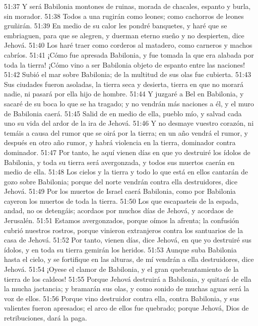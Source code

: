 51:37 Y será Babilonia montones de ruinas, morada de chacales, espanto y burla, sin morador. 
51:38 Todos a una rugirán como leones; como cachorros de leones gruñirán. 
51:39 En medio de su calor les pondré banquetes, y haré que se embriaguen, para que se alegren, y duerman eterno sueño y no despierten, dice Jehová. 
51:40 Los haré traer como corderos al matadero, como carneros y machos cabríos. 
51:41 ¡Cómo fue apresada Babilonia, y fue tomada la que era alabada por toda la tierra! ¡Cómo vino a ser Babilonia objeto de espanto entre las naciones! 
51:42 Subió el mar sobre Babilonia; de la multitud de sus olas fue cubierta. 
51:43 Sus ciudades fueron asoladas, la tierra seca y desierta, tierra en que no morará nadie, ni pasará por ella hijo de hombre. 
51:44 Y juzgaré a Bel en Babilonia, y sacaré de su boca lo que se ha tragado; y no vendrán más naciones a él, y el muro de Babilonia caerá. 
51:45 Salid de en medio de ella, pueblo mío, y salvad cada uno su vida del ardor de la ira de Jehová. 
51:46 Y no desmaye vuestro corazón, ni temáis a causa del rumor que se oirá por la tierra; en un año vendrá el rumor, y después en otro año rumor, y habrá violencia en la tierra, dominador contra dominador. 
51:47 Por tanto, he aquí vienen días en que yo destruiré los ídolos de Babilonia, y toda su tierra será avergonzada, y todos sus muertos caerán en medio de ella. 
51:48 Los cielos y la tierra y todo lo que está en ellos cantarán de gozo sobre Babilonia;  porque del norte vendrán contra ella destruidores, dice Jehová. 
51:49 Por los muertos de Israel caerá Babilonia, como por Babilonia cayeron los muertos de toda la tierra.  
51:50 Los que escapasteis de la espada, andad, no os detengáis; acordaos por muchos días de Jehová, y acordaos de Jerusalén. 
51:51 Estamos avergonzados, porque oímos la afrenta; la confusión cubrió nuestros rostros, porque vinieron extranjeros contra los santuarios de la casa de Jehová. 
51:52 Por tanto, vienen días, dice Jehová, en que yo destruiré sus ídolos, y en toda su tierra gemirán los heridos. 
51:53 Aunque suba Babilonia hasta el cielo, y se fortifique en las alturas, de mí vendrán a ella destruidores, dice Jehová. 
51:54 ¡Oyese el clamor de Babilonia, y el gran quebrantamiento de la tierra de los caldeos! 
51:55 Porque Jehová destruirá a Babilonia, y quitará de ella la mucha jactancia; y bramarán sus olas, y como sonido de muchas aguas será la voz de ellos. 
51:56 Porque vino destruidor contra ella, contra Babilonia, y sus valientes fueron apresados; el arco de ellos fue quebrado; porque Jehová, Dios de retribuciones, dará la paga. 
